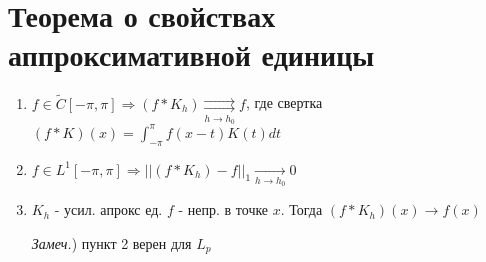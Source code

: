 \documentclass[paper=a4, fontsize=14pt]{report}
\begin{document}
    \section{Теорема о свойствах аппроксимативной единицы}
    \begin{enumerate}
        \item $f \in \widetilde{C}[-\pi, \pi] \Rightarrow (f * K_h) \underset{h \rightarrow h_0}{\rightrightarrows} f $, где
        свертка $(f* K)(x) = \int_{-\pi}^{\pi} f(x-t)K(t)dt$
        
        \item $f \in L^1 [-\pi, \pi] \Rightarrow ||(f * K_h) - f||_1 \underset{h \rightarrow h_0}{\rightarrow} 0 $
        \item $K_h$ - усил. апрокс ед. $f$ - непр. в точке $x$. Тогда $(f * K_h)(x) \rightarrow f(x)$

        \emph{Замеч.}) пункт 2 верен для $ L_p $
    \end{enumerate}
    
\end{document}
